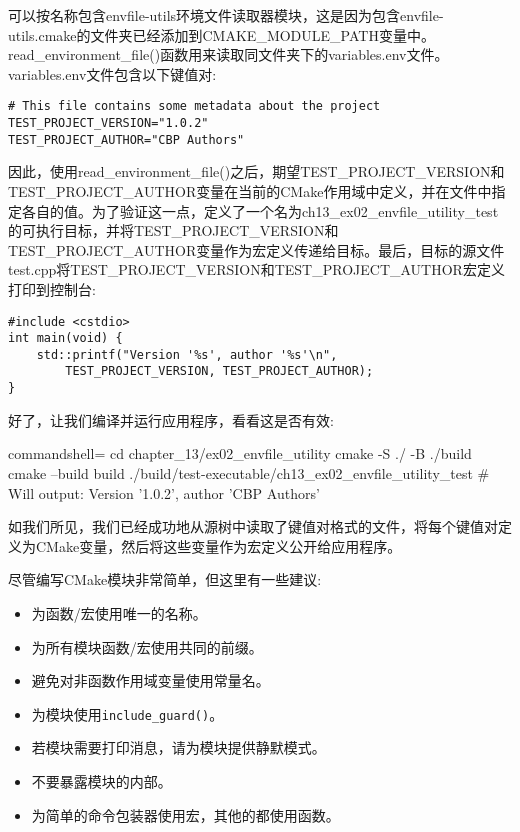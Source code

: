 可以按名称包含envfile-utils环境文件读取器模块，这是因为包含envfile-utils.cmake的文件夹已经添加到CMAKE\_MODULE\_PATH变量中。read\_environment\_file()函数用来读取同文件夹下的variables.env文件。variables.env文件包含以下键值对:

\begin{lstlisting}[style=styleCMake]
# This file contains some metadata about the project
TEST_PROJECT_VERSION="1.0.2"
TEST_PROJECT_AUTHOR="CBP Authors"
\end{lstlisting}

因此，使用read\_environment\_file()之后，期望TEST\_PROJECT\_VERSION和TEST\_PROJECT\_AUTHOR变量在当前的CMake作用域中定义，并在文件中指定各自的值。为了验证这一点，定义了一个名为ch13\_ex02\_envfile\_utility\_test的可执行目标，并将TEST\_PROJECT\_VERSION和TEST\_PROJECT\_AUTHOR变量作为宏定义传递给目标。最后，目标的源文件test.cpp将TEST\_PROJECT\_VERSION和TEST\_PROJECT\_AUTHOR宏定义打印到控制台:

\begin{lstlisting}[style=styleCXX]
#include <cstdio>
int main(void) {
	std::printf("Version '%s', author '%s'\n",
		TEST_PROJECT_VERSION, TEST_PROJECT_AUTHOR);
}
\end{lstlisting}

好了，让我们编译并运行应用程序，看看这是否有效:

\begin{tcblisting}{commandshell={}}
cd chapter_13/ex02_envfile_utility
cmake -S ./ -B ./build
cmake --build build
./build/test-executable/ch13_ex02_envfile_utility_test
# Will output: Version '1.0.2', author 'CBP Authors'
\end{tcblisting}

如我们所见，我们已经成功地从源树中读取了键值对格式的文件，将每个键值对定义为CMake变量，然后将这些变量作为宏定义公开给应用程序。

尽管编写CMake模块非常简单，但这里有一些建议:

\begin{itemize}
\item 
为函数/宏使用唯一的名称。

\item 
为所有模块函数/宏使用共同的前缀。

\item 
避免对非函数作用域变量使用常量名。

\item 
为模块使用\texttt{include\_guard()}。

\item 
若模块需要打印消息，请为模块提供静默模式。

\item 
不要暴露模块的内部。

\item 
为简单的命令包装器使用宏，其他的都使用函数。
\end{itemize}

